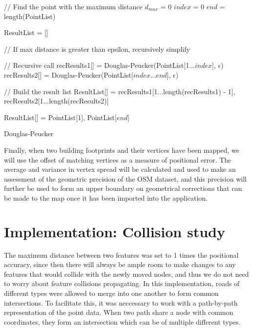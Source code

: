 \documentclass[a4paper]{article}
\begin{document}
\begin{algorithm}[H]
\SetAlgoLined
{}
    // Find the point with the maximum distance\;
    $d_{max}$ = 0\;
    $index$ = 0\;
    $end$ = length(PointList)\;
    

    ResultList = []\;
    
    // If max distance is greater than epsilon, recursively simplify\;
     {
        // Recursive call\;
        recResults1[] = Douglas-Peucker(PointList[1...$index$], $\epsilon$)\;
        recResults2[] = Douglas-Peucker(PointList[$index$...$end$], $\epsilon$)\;

        // Build the result list\;
        ResultList[] = {recResults1[1...length(recResults1) - 1], recResults2[1...length(recResults2)]}\;
    }{
        ResultList[] = {PointList[1], PointList[$end$]}\;
    }
    \;

    \caption{Douglas-Peucker}
\end{algorithm}

Finally, when two building footprints and their vertices have been mapped, we will use the offset of matching vertices as a measure of positional error. The average and variance in vertex spread will be calculated and used to make an assessment of the geometric precision of the OSM dataset, and this precision will further be used to form an upper boundary on geometrical corrections that can be made to the map once it has been imported into the application.

\section{Implementation: Collision study}

The maximum distance between two features was set to 1 times the positional accuracy, since then there will always be ample room to make changes to any features that would collide with the newly moved nodes, and thus we do not need to worry about feature collisions propagating.
In this implementation, roads of different types were allowed to merge into one another to form common intersections.
To facilitate this, it was neccessary to work with a path-by-path representation of the point data.
When two path share a node with common coordinates, they form an intersection which can be of multiple different types.
\end{document}
